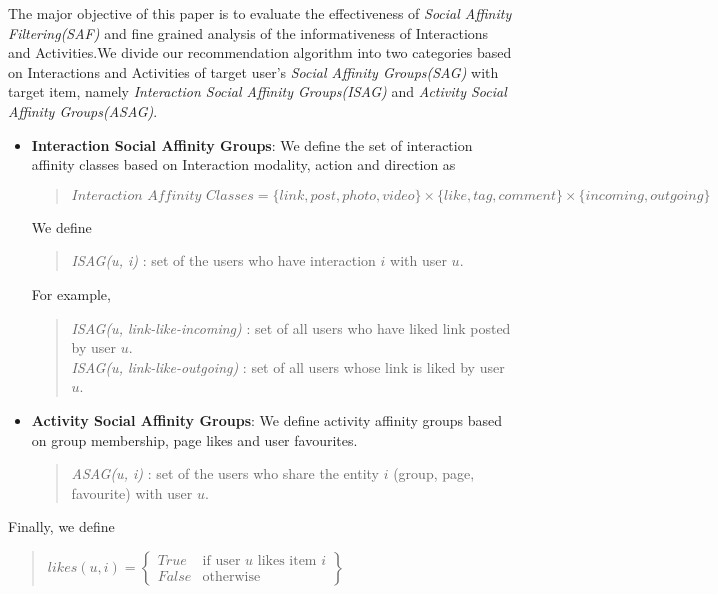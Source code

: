 
The major objective of this paper is to evaluate the effectiveness of \textit{Social Affinity Filtering(SAF)} and fine grained 
analysis of the informativeness of Interactions and Activities.We divide our recommendation algorithm into two categories based 
on Interactions and Activities of target user's \textit{ Social Affinity Groups(SAG)} with target item, 
namely \textit{Interaction  Social Affinity Groups(ISAG)} and \textit{Activity Social Affinity Groups(ASAG)}.

\begin{itemize}
  \item \textbf{Interaction  Social Affinity Groups}: We define the set of interaction affinity classes based on 
  Interaction modality, action and direction as
  \begin{quote}
  \begin{math}
  	\textit{Interaction Affinity Classes} = \{link, post, photo, video\} \times \{like, tag, comment\} \times \{incoming, outgoing\}
  \end{math}
  \end{quote}
  We define 
  \begin{quote}
  \textit{ISAG(u, i)} : set of the users who have interaction $i$ with user $u$.
  \end{quote}
   For example,
   \begin{quote}
   
   \textit{ISAG(u, link-like-incoming)} : set of all users who have liked link posted by user $u$. \\
   \textit{ISAG(u, link-like-outgoing)} : set of all users whose link is liked by user $u$. \\
   \end{quote}
\item \textbf{Activity Social Affinity Groups}: We define activity affinity groups based on group membership, page likes and user favourites.
	\begin{quote}
	\textit{ASAG(u, i)} : set of the users who share the entity $i$ (group, page, favourite) with user $u$.   
	\end{quote}
\end{itemize}
Finally, we define
\begin{quote}
\begin{math}
likes(u,i) =  \begin{Bmatrix}
	  True & \text{if user $u$ likes item $i$}\\
	  False & \text{otherwise}
	  \end{Bmatrix}
\end{math}
\end{quote}
